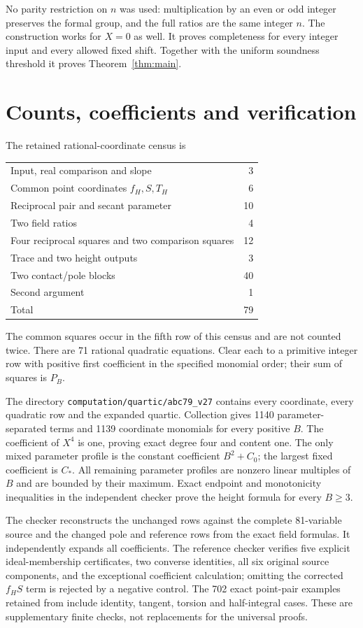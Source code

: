 \documentclass[11pt,a4paper]{article}
\begin{document}
No parity restriction on $n$ was used: multiplication by an even or
odd integer preserves the formal group, and the full ratios are the
same integer $n$. The construction works for $X=0$ as well. It proves
completeness for every integer input and every allowed fixed shift.
Together with the uniform soundness threshold it proves
Theorem~\ref{thm:main}.

\section{Counts, coefficients and verification}
The retained rational-coordinate census is
\begin{center}\begin{tabular}{lr}\toprule
Input, real comparison and slope&3\\
Common point coordinates $f_H,S,T_H$&6\\
Reciprocal pair and secant parameter&10\\
Two field ratios&4\\
Four reciprocal squares and two comparison squares&12\\
Trace and two height outputs&3\\
Two contact/pole blocks&40\\
Second argument&1\\\midrule Total&79\\\bottomrule
\end{tabular}\end{center}
The common squares occur in the fifth row of this census and are not
counted twice. There are 71 rational quadratic equations. Clear each
to a primitive integer row with positive first coefficient in the
specified monomial order; their sum of squares is $P_B$.

The directory \nolinkurl{computation/quartic/abc79_v27} contains every
coordinate, every quadratic row and the expanded quartic. Collection
gives 1140 parameter-separated terms and 1139 coordinate monomials
for every positive $B$. The coefficient of $X^4$ is one, proving
exact degree four and content one. The only mixed parameter profile
is the constant coefficient $B^2+C_0$; the largest fixed coefficient
is $C_*$. All remaining parameter profiles are nonzero linear
multiples of $B$ and are bounded by their maximum. Exact endpoint
and monotonicity inequalities in the independent checker prove the
height formula for every $B\ge3$.

The checker reconstructs the unchanged rows against the complete
81-variable source and the changed pole and reference rows from
the exact field formulas. It independently expands all coefficients.
The reference checker verifies five explicit ideal-membership
certificates, two converse identities, all six original source
components, and the exceptional coefficient calculation; omitting
the corrected $f_HS$ term is rejected by a negative control.
The 702 exact point-pair examples retained from \cite{TraceAll}
include identity, tangent, torsion and half-integral cases. These are
supplementary finite checks, not replacements for the universal proofs.
\end{document}
